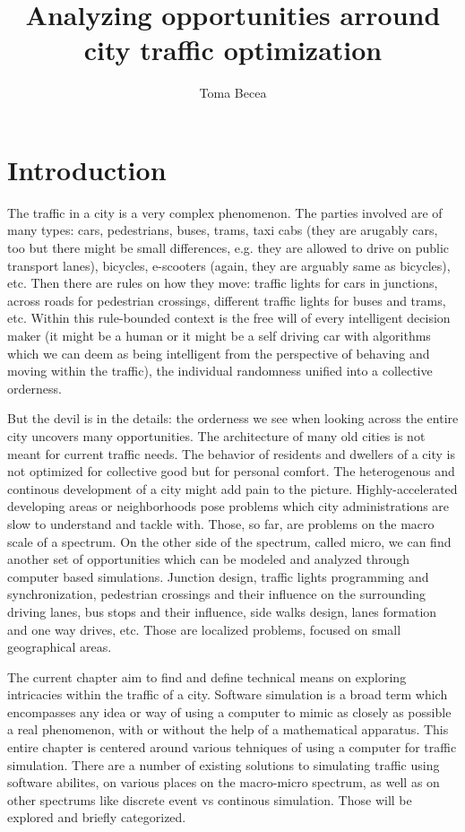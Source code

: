 \documentclass[a4paper,12pt,twoside]{book}
\title{Analyzing opportunities arround city traffic optimization }
\author{Toma Becea}
\begin{document}
\maketitle

\clearpage

\section{Introduction}

The traffic in a city is a very complex phenomenon. The parties involved are of many types: cars, pedestrians, buses, trams, taxi cabs (they are arugably cars, too but there might be small differences, e.g. they are allowed to drive on public transport lanes), bicycles, e-scooters (again, they are arguably same as bicycles), etc. Then there are rules on how they move: traffic lights for cars in junctions, across roads for pedestrian crossings, different traffic lights for buses and trams, etc. Within this rule-bounded context is the free will of every intelligent decision maker (it might be a human or it might be a self driving car with algorithms which we can deem as being intelligent from the perspective of behaving and moving within the traffic), the individual randomness unified into a collective orderness.

But the devil is in the details: the orderness we see when looking across the entire city uncovers many opportunities. The architecture of many old cities is not meant for current traffic needs. The behavior of residents and dwellers of a city is not optimized for collective good but for personal comfort. The heterogenous and continous development of a city might add pain to the picture. Highly-accelerated developing areas or neighborhoods pose problems which city administrations are slow to understand and tackle with. Those, so far, are problems on the macro scale of a spectrum. On the other side of the spectrum, called micro, we can find another set of opportunities which can be modeled and analyzed through computer based simulations. Junction design, traffic lights programming and synchronization, pedestrian crossings and their influence on the surrounding driving lanes, bus stops and their influence, side walks design, lanes formation and one way drives, etc. Those are localized problems, focused on small geographical areas.

The current chapter aim to find and define technical means on exploring intricacies within the traffic of a city. Software simulation is a broad term which encompasses any idea or way of using a computer to mimic as closely as possible a real phenomenon, with or without the help of a mathematical apparatus. This entire chapter is centered around various tehniques of using a computer for traffic simulation. There are a number of existing solutions to simulating traffic using software abilites, on various places on the macro-micro spectrum, as well as on other spectrums like discrete event vs continous simulation. Those will be explored and briefly categorized.
\end{document}

